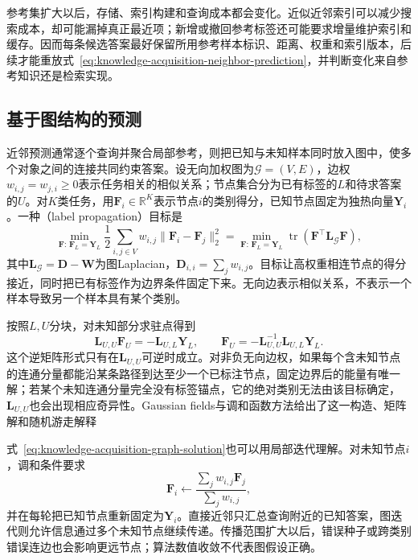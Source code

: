 参考集扩大以后，存储、索引构建和查询成本都会变化。近似近邻索引可以减少搜索成本，却可能漏掉真正最近项；新增或撤回参考标签还可能要求增量维护索引和缓存。因而每条候选答案最好保留所用参考样本标识、距离、权重和索引版本，后续才能重放式~\eqref{eq:knowledge-acquisition-neighbor-prediction}，并判断变化来自参考知识还是检索实现。

\subsection{基于图结构的预测}
\label{sec:knowledge-acquisition-graph-prediction}

近邻预测通常逐个查询并聚合局部参考，则把已知与未知样本同时放入图中，使多个对象之间的连接共同约束答案。设无向加权图为$\mathcal{G}=(V,E)$，边权$w_{i,j}=w_{j,i}\geq0$表示任务相关的相似关系；节点集合分为已有标签的$L$和待求答案的$U$。对$K$类任务，用$\bm{F}_i\in\mathbb{R}^{K}$表示节点$i$的类别得分，已知节点固定为独热向量$\bm{Y}_i$。一种（label propagation）目标是
\begin{equation}
  \min_{\bm{F}:\,\bm{F}_L=\bm{Y}_L}
  \frac{1}{2}\sum_{i,j\in V}w_{i,j}\lVert\bm{F}_i-\bm{F}_j\rVert_2^2
  =
  \min_{\bm{F}:\,\bm{F}_L=\bm{Y}_L}
  \operatorname{tr}\!\left(\bm{F}^{\top}\bm{L}_{\mathcal{G}}\bm{F}\right),
  \label{eq:knowledge-acquisition-graph-energy}
\end{equation}
其中$\bm{L}_{\mathcal{G}}=\bm{D}-\bm{W}$为图Laplacian，$\bm{D}_{i,i}=\sum_jw_{i,j}$。目标让高权重相连节点的得分接近，同时把已有标签作为边界条件固定下来。无向边表示相似关系，不表示一个样本导致另一个样本具有某个类别。

按照$L,U$分块，对未知部分求驻点得到
\begin{equation}
  \bm{L}_{U,U}\bm{F}_U
  =
  -\bm{L}_{U,L}\bm{Y}_L,
  \qquad
  \bm{F}_U
  =
  -\bm{L}_{U,U}^{-1}\bm{L}_{U,L}\bm{Y}_L.
  \label{eq:knowledge-acquisition-graph-solution}
\end{equation}
这个逆矩阵形式只有在$\bm{L}_{U,U}$可逆时成立。对非负无向边权，如果每个含未知节点的连通分量都能沿某条路径到达至少一个已标注节点，固定边界后的能量有唯一解；若某个未知连通分量完全没有标签锚点，它的绝对类别无法由该目标确定，$\bm{L}_{U,U}$也会出现相应奇异性。Gaussian fields与调和函数方法给出了这一构造、矩阵解和随机游走解释

式~\eqref{eq:knowledge-acquisition-graph-solution}也可以用局部迭代理解。对未知节点$i$，调和条件要求
\[
  \bm{F}_i
  \leftarrow
  \frac{\sum_j w_{i,j}\bm{F}_j}{\sum_j w_{i,j}},
\]
并在每轮把已知节点重新固定为$\bm{Y}_i$。直接近邻只汇总查询附近的已知答案，图迭代则允许信息通过多个未知节点继续传递。传播范围扩大以后，错误种子或跨类别错误连边也会影响更远节点；算法数值收敛不代表图假设正确。

